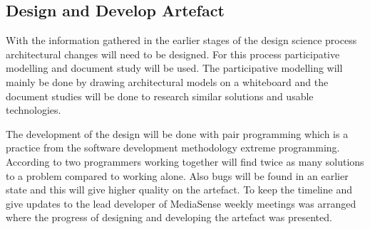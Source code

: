 \subsection{Design and Develop Artefact}
With the information gathered in the earlier stages of the design science process architectural changes will need to be designed. For this process participative modelling \cite{johannesson2012design} and document study will be used. The participative modelling will mainly be done by drawing architectural models on a whiteboard and the document studies will be done to research similar solutions and usable technologies. 

The development of the design will be done with pair programming \cite{williams2000all} which is a practice from the software development methodology extreme programming. According to  \cite{williams2000all} two programmers working together will find twice as many solutions to a problem compared to working alone. Also bugs will be found in an earlier state and this will give higher quality on the artefact. To keep the timeline and give updates to the lead developer of MediaSense weekly meetings was arranged where the progress of designing and developing the artefact was presented. 